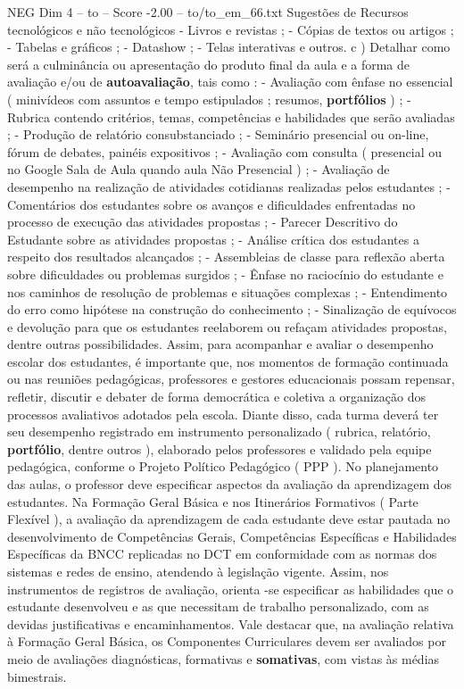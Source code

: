 \begin{textsample}{NEG Dim 4 – to – Score -2.00 – to/to\_em\_66.txt}
Sugestões de Recursos tecnológicos e não tecnológicos - Livros e revistas ; - Cópias de textos ou artigos ; - Tabelas e gráficos ; - Datashow ; - Telas interativas e outros. c ) Detalhar como será a culminância ou apresentação do produto final da aula e a forma de avaliação e/ou de \textbf{autoavaliação}, tais como : - Avaliação com ênfase no essencial ( minivídeos com assuntos e tempo estipulados ; resumos, \textbf{portfólios} ) ; - Rubrica contendo critérios, temas, competências e habilidades que serão avaliadas ; - Produção de relatório consubstanciado ; - Seminário presencial ou on-line, fórum de debates, painéis expositivos ; - Avaliação com consulta ( presencial ou no Google Sala de Aula quando aula Não Presencial ) ; - Avaliação de desempenho na realização de atividades cotidianas realizadas pelos estudantes ; - Comentários dos estudantes sobre os avanços e dificuldades enfrentadas no processo de execução das atividades propostas ; - Parecer Descritivo do Estudante sobre as atividades propostas ; - Análise crítica dos estudantes a respeito dos resultados alcançados ; - Assembleias de classe para reflexão aberta sobre dificuldades ou problemas surgidos ; - Ênfase no raciocínio do estudante e nos caminhos de resolução de problemas e situações complexas ; - Entendimento do erro como hipótese na construção do conhecimento ; - Sinalização de equívocos e devolução para que os estudantes reelaborem ou refaçam atividades propostas, dentre outras possibilidades.
Assim, para acompanhar e avaliar o desempenho escolar dos estudantes, é importante que, nos momentos de formação continuada ou nas reuniões pedagógicas, professores e gestores educacionais possam repensar, refletir, discutir e debater de forma democrática e coletiva a organização dos processos avaliativos adotados pela escola.
Diante disso, cada turma deverá ter seu desempenho registrado em instrumento personalizado ( rubrica, relatório, \textbf{portfólio}, dentre outros ), elaborado pelos professores e validado pela equipe pedagógica, conforme o Projeto Político Pedagógico ( PPP ).
No planejamento das aulas, o professor deve especificar aspectos da avaliação da aprendizagem dos estudantes.
Na Formação Geral Básica e nos Itinerários Formativos ( Parte Flexível ), a avaliação da aprendizagem de cada estudante deve estar pautada no desenvolvimento de Competências Gerais, Competências Específicas e Habilidades Específicas da BNCC replicadas no DCT em conformidade com as normas dos sistemas e redes de ensino, atendendo à legislação vigente.
Assim, nos instrumentos de registros de avaliação, orienta -se especificar as habilidades que o estudante desenvolveu e as que necessitam de trabalho personalizado, com as devidas justificativas e encaminhamentos.
Vale destacar que, na avaliação relativa à Formação Geral Básica, os Componentes Curriculares devem ser avaliados por meio de avaliações diagnósticas, formativas e \textbf{somativas}, com vistas às médias bimestrais.

\end{textsample}
